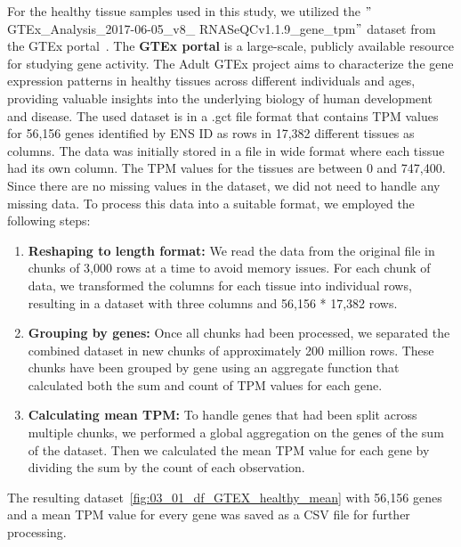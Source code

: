 For the healthy tissue samples used in this study,
we utilized the $"$GTEx\_Analysis\_2017-06-05\_v8\_\newline
RNASeQCv1.1.9\_gene\_tpm$"$ dataset from the GTEx portal~\cite{gtex_download}.
The \textbf{GTEx portal} is a large-scale, publicly available resource for studying gene activity.
The Adult GTEx project aims to characterize the gene expression patterns in healthy tissues across different individuals and ages,
providing valuable insights into the underlying biology of human development and disease.
The used dataset is in a .gct file format that contains TPM values for 56,156 genes identified by ENS ID as rows in 17,382 different tissues as columns.
The data was initially stored in a file in wide format where each tissue had its own column.
The TPM values for the tissues are between 0 and 747,400.
Since there are no missing values in the dataset, we did not need to handle any missing data.
To process this data into a suitable format, we employed the following steps:
\begin{enumerate}
    \item \textbf{Reshaping to length format:} We read the data from the original file in chunks of 3,000 rows at a time to avoid memory issues.
    For each chunk of data, we transformed the columns for each tissue into individual rows,
    resulting in a dataset with three columns and 56,156 * 17,382 rows.
    \item \textbf{Grouping by genes:} Once all chunks had been processed, we separated the combined dataset in new chunks of approximately 200 million rows.
    These chunks have been grouped by gene using an aggregate function that calculated both the sum and count of TPM values for each gene.
    \item \textbf{Calculating mean TPM:} To handle genes that had been split across multiple chunks,
    we performed a global aggregation on the genes of the sum of the dataset.
    Then we calculated the mean TPM value for each gene by dividing the sum by the count of each observation.
\end{enumerate}
The resulting dataset~\ref{fig:03_01_df_GTEX_healthy_mean} with 56,156 genes and a mean TPM value for every gene was saved as a CSV file for further processing.\\

